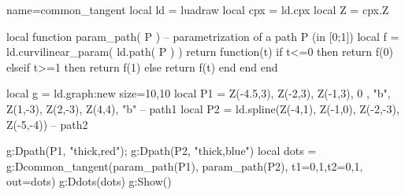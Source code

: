 \documentclass{standalone}
\begin{document}
\begin{luadraw}{name=common_tangent}
local ld = luadraw
local cpx = ld.cpx
local Z = cpx.Z

local function param_path( P ) -- parametrization of a path P (in [0;1])
    local f = ld.curvilinear_param( ld.path( P ) )
    return function(t) 
            if t<=0 then return f(0)
            elseif t>=1 then return f(1)
            else return f(t)
            end
        end
end

local g = ld.graph:new{ size={10,10} }
local P1 = {Z(-4.5,3), Z(-2,3), Z(-1,3), 0 , "b", Z(1,-3), Z(2,-3), Z(4,4), "b"} -- path1
local P2 = ld.spline({Z(-4,1), Z(-1,0), Z(-2,-3), Z(-5,-4)}) -- path2

g:Dpath(P1, "thick,red"); g:Dpath(P2, "thick,blue")
local dots = {}
g:Dcommon_tangent(param_path(P1), param_path(P2), {t1={0,1},t2={0,1}, out=dots})
g:Ddots(dots)
g:Show()
\end{luadraw}
\end{document}
